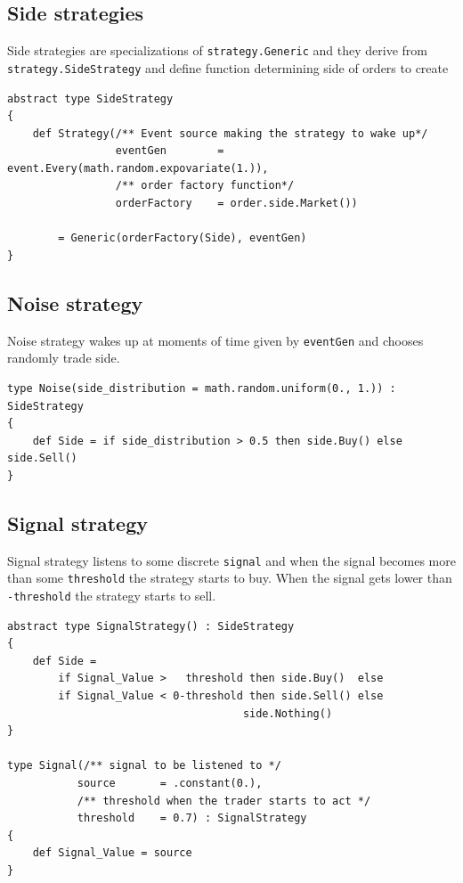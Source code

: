 \documentclass[a4paper,11pt]{article}
\begin{document}
\subsection{Side strategies}

Side strategies are specializations of \texttt{strategy.Generic} and they 
derive from \texttt{strategy.SideStrategy} and define function determining 
side of orders to create

\begin{verbatim}
abstract type SideStrategy
{
    def Strategy(/** Event source making the strategy to wake up*/
                 eventGen        = event.Every(math.random.expovariate(1.)),
                 /** order factory function*/
                 orderFactory    = order.side.Market())

        = Generic(orderFactory(Side), eventGen)
}
\end{verbatim}

\subsection{Noise strategy}\label{noise-strategy}

Noise strategy wakes up at moments of time given by \texttt{eventGen}
and chooses randomly trade side.

\begin{verbatim}
type Noise(side_distribution = math.random.uniform(0., 1.)) : SideStrategy
{
    def Side = if side_distribution > 0.5 then side.Buy() else side.Sell()
}
\end{verbatim}

\subsection{Signal strategy}\label{signal-strategy}

Signal strategy listens to some discrete \texttt{signal} and when the
signal becomes more than some \texttt{threshold} the strategy starts to
buy. When the signal gets lower than \texttt{-threshold} the strategy
starts to sell.

\begin{verbatim}
abstract type SignalStrategy() : SideStrategy
{
    def Side =
        if Signal_Value >   threshold then side.Buy()  else
        if Signal_Value < 0-threshold then side.Sell() else
                                     side.Nothing()
}

type Signal(/** signal to be listened to */
           source       = .constant(0.),
           /** threshold when the trader starts to act */
           threshold    = 0.7) : SignalStrategy
{
    def Signal_Value = source
}
\end{verbatim}
\end{document}
